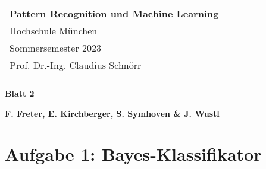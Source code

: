 \documentclass[a4paper,12pt]{article}
\begin{document}
\thispagestyle{empty} 

\begin{tabular}{p{15.5cm}} 
{\large \bf Pattern Recognition und Machine Learning} \\
Hochschule München \\ Sommersemester 2023  \\ Prof. Dr.-Ing. Claudius Schnörr \\
\hline 
\\
\end{tabular} 

\vspace*{0.3cm} 

\begin{center} 
	{\Large \bf Blatt 2} 
	\vspace{2mm}
	

	{\bf F. Freter, E. Kirchberger, S. Symhoven \& J. Wustl} 
		
\end{center}  

\vspace{0.4cm}

\section*{Aufgabe 1: Bayes-Klassifikator}
\end{document}
